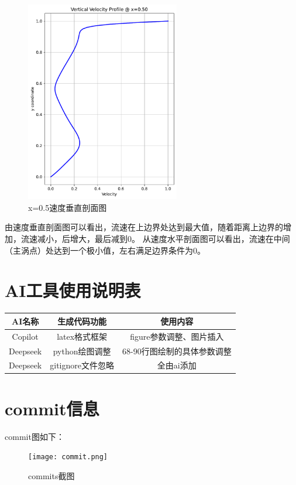 \documentclass[12pt,a4paper]{article}
\begin{document}
\begin{figure}[H]
    \centering
    \includegraphics[width=0.6\textwidth]{3_vertical_profile.pdf}
    \caption{x=0.5速度垂直剖面图}
    \label{fig:vertical_profile_b}
\end{figure}
由速度垂直剖面图可以看出，流速在上边界处达到最大值，随着距离上边界的增加，流速减小，后增大，最后减到0。
从速度水平剖面图可以看出，流速在中间（主涡点）处达到一个极小值，左右满足边界条件为0。

\section{AI工具使用说明表}
\begin{table}[!htbp]
    \centering
    \begin{tabular}{|c|c|c|}
        \hline
        \textbf{AI名称} & \textbf{生成代码功能} & \textbf{使用内容} \\
        \hline
        Copilot & latex格式框架 & figure参数调整、图片插入\\
        \hline
        Deepseek & python绘图调整 & 68-90行图绘制的具体参数调整\\
        \hline
        Deepseek & gitignore文件忽略 & 全由ai添加\\
        \hline
\end{tabular}
\end{table}
\section{commit信息}
commit图如下：
\begin{figure}[H]
    \centering
    \texttt{[image: commit.png]}
    \caption{commits截图}
    \label{fig:commit}
\end{figure}
\end{document}
